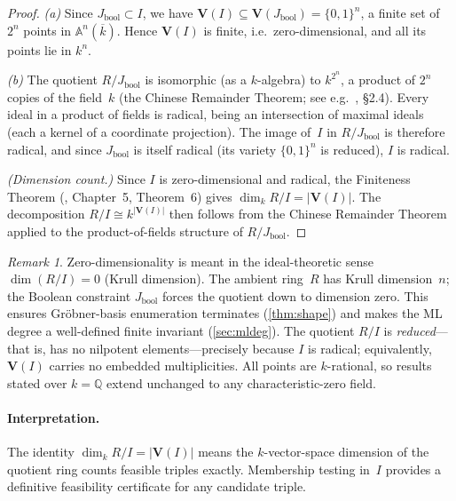 \documentclass[preprint,12pt]{elsarticle}
\theoremstyle{definition}
\theoremstyle{remark}
\newtheorem{remark}[theorem]{Remark}
\newcommand{\kk}{k}
\newcommand{\QQ}{\mathbb{Q}}
\newcommand{\Var}{\mathbf{V}}
\begin{document}
\begin{proof}
\textit{(a)}\; Since $J_{\mathrm{bool}} \subset I$, we have
$\Var(I) \subseteq \Var(J_{\mathrm{bool}}) = \{0,1\}^n$, a finite
set of $2^n$ points in $\mathbb{A}^n(\overline{\kk})$.  Hence
$\Var(I)$ is finite, i.e.\ zero-dimensional, and all its points
lie in $\kk^n$.

\textit{(b)}\; The quotient $R/J_{\mathrm{bool}}$ is isomorphic
(as a $\kk$-algebra) to $\kk^{2^n}$, a product of $2^n$ copies
of the field~$\kk$ (the Chinese Remainder Theorem;
see e.g.~\cite{Eisenbud95}, \S2.4).  Every ideal in a product of
fields is radical, being an intersection of maximal ideals (each a
kernel of a coordinate projection).  The image of~$I$ in
$R/J_{\mathrm{bool}}$ is therefore radical, and since
$J_{\mathrm{bool}}$ is itself radical (its variety $\{0,1\}^n$ is
reduced), $I$ is radical.

\textit{(Dimension count.)}\; Since $I$ is zero-dimensional and
radical, the Finiteness Theorem
(\cite{CLO15}, Chapter~5, Theorem~6) gives
$\dim_\kk R/I = |\Var(I)|$.  The decomposition
$R/I \cong \kk^{|\Var(I)|}$ then follows from the Chinese
Remainder Theorem applied to the product-of-fields structure of
$R/J_{\mathrm{bool}}$.
\end{proof}

\begin{remark}\label{rem:zero-dim}
Zero-dimensionality is meant in the ideal-theoretic sense
$\dim(R/I) = 0$ (Krull dimension).  The ambient ring~$R$ has Krull
dimension~$n$; the Boolean constraint $J_{\mathrm{bool}}$ forces
the quotient down to dimension zero.  This ensures
Gr\"obner-basis enumeration terminates
(\cref{thm:shape}) and makes the ML degree a well-defined finite
invariant (\cref{sec:mldeg}).  The quotient $R/I$ is
\emph{reduced}---that is, has no nilpotent elements---precisely
because $I$ is radical; equivalently, $\Var(I)$ carries no embedded
multiplicities.  All points are $\kk$-rational, so results stated
over $\kk = \QQ$ extend unchanged to any characteristic-zero field.
\end{remark}

\paragraph{Interpretation.}
The identity $\dim_\kk R/I = |\Var(I)|$ means the $\kk$-vector-space
dimension of the quotient ring counts feasible triples exactly.
Membership testing in~$I$ provides a definitive feasibility
certificate for any candidate triple.
\end{document}

